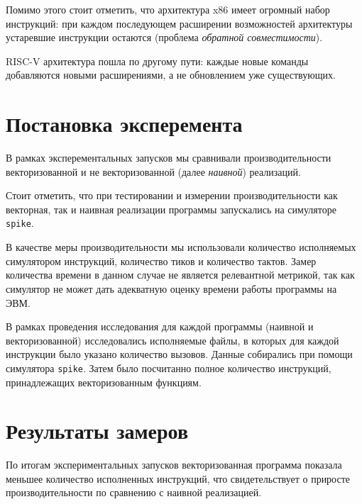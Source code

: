 \documentclass[a4paper, 12pt]{article}
\begin{document}
    Помимо этого стоит отметить, что архитектура x$86$ имеет огромный набор инструкций: при каждом последующем
    расширении возможностей архитектуры устаревшие инструкции остаются (проблема \textit {обратной совместимости}).
    
    RISC-V архитектура пошла по другому пути: каждые новые команды добавляются новыми расширениями, а не обновлением
    уже существующих.



    \section{Постановка эксперемента}
    В рамках эксперементальных запусков мы сравнивали производительности векторизованной
    и не векторизованной (далее \textit{наивной}) реализаций.

    Стоит отметить, что при тестировании и измерении производительности 
    как векторная, так и наивная реализации программы запускались на симуляторе \texttt{spike}.

    В качестве меры производительности мы использовали количество исполняемых симулятором
    инструкций, количество тиков и количество тактов. Замер количества времени в
    данном случае не является релевантной метрикой, так как симулятор не может дать
    адекватную оценку времени работы программы на ЭВМ.

    В рамках проведения исследования для каждой программы 
    (наивной и векторизованной) исследовались исполняемые файлы, 
    в которых для каждой инструкции было указано количество вызовов. 
    Данные собирались при помощи симулятора \texttt{spike}. Затем было посчитанно полное количество инструкций, принадлежащих векторизованным функциям.

    \section{Результаты замеров}

    По итогам экспериментальных запусков векторизованная программа показала меньшее 
    количество исполненных инструкций, что свидетельствует о приросте производительности 
    по сравнению с наивной реализацией.
\end{document}
